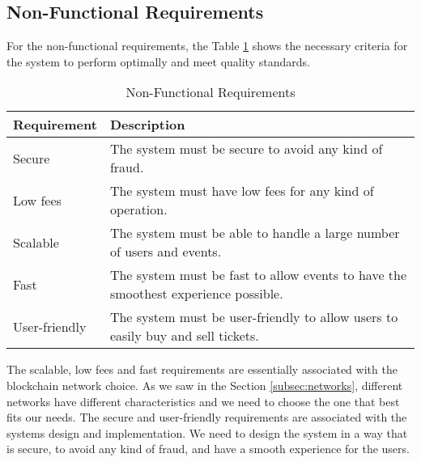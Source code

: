 \subsection{Non-Functional Requirements}
\label{subsec:non_functional_requirements}

For the non-functional requirements, the Table
\ref{tab:non_functional_requirements} shows the necessary criteria for the system to perform optimally and meet quality standards.

\begin{table}[H]
    \begin{tabularx}{\textwidth}{lX}
        \hline
        \textbf{Requirement} & \textbf{Description}                                                               \\
        \hline
        Secure               & The system must be secure to avoid any kind of fraud.                              \\
        \hline
        Low fees             & The system must have low fees for any kind of operation.                           \\
        \hline
        Scalable             & The system must be able to handle a large number of users and events.              \\
        \hline
        Fast                 & The system must be fast to allow events to have the smoothest experience possible. \\
        \hline
        User-friendly        & The system must be user-friendly to allow users to easily buy and sell tickets.    \\
        \hline
    \end{tabularx}
    \caption{Non-Functional Requirements}
    \label{tab:non_functional_requirements}
\end{table}

The scalable, low fees and fast requirements are essentially associated with
the blockchain network choice. As we saw in the Section \ref{subsec:networks},
different networks have different characteristics and we need to choose the one
that best fits our needs. The secure and user-friendly requirements are
associated with the systems design and implementation. We need to design the
system in a way that is secure, to avoid any kind of fraud, and have a smooth
experience for the users.
